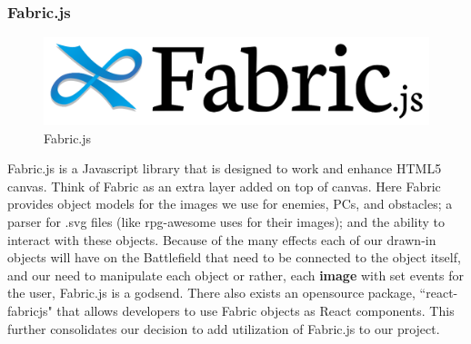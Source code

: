 \documentclass[12pt,a4paper]{report}
\begin{document}
			\subsubsection{Fabric.js}
			\begin{figure}
				\includegraphics[scale=0.15]{fabric}
				\caption{Fabric.js}
				\label{fig: Fabric.js}
			\end{figure}
			Fabric.js is a Javascript library that is designed to work and enhance HTML5 canvas. Think of Fabric as an extra layer added on top of canvas. Here Fabric provides object models for the images we use for enemies, PCs, and obstacles; a parser for .svg files (like rpg-awesome uses for their images); and the ability to interact with these objects. Because of the many effects each of our drawn-in objects will have on the Battlefield that need to be connected to the object itself, and our need to manipulate each object or rather, each \textbf{image} with set events for the user, Fabric.js is a godsend. There also exists an opensource package, ``react-fabricjs" that allows developers to use Fabric objects as React components. This further consolidates our decision to add utilization of Fabric.js to our project.
\end{document}
